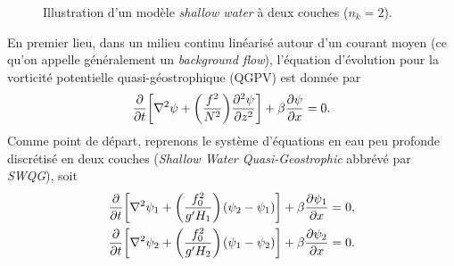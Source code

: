 \documentclass[10pt]{article}
\numberwithin{equation}{section}
\newcommand{\pt}{\hspace{1pt}} %
\begin{document}
\begin{figure}
\begin{center}
\vspace{-\baselineskip}
\end{center}
\caption{\label{org3e55fbe}Illustration d'un modèle \textit{shallow water} à deux couches (\(n_k = 2\)).}
\end{figure}

En premier lieu, dans un milieu continu linéarisé autour d'un courant moyen (ce qu'on appelle généralement un \emph{background flow}), l'équation d'évolution pour la vorticité potentielle quasi-géostrophique (QGPV) est donnée par
\begin{equation}
\label{eq:org970df7f}
   \pdv{}{t} \qty[\laplacian\psi + \qty(\frac{f^2}{N^2})\pdv[2]{\psi}{z}] + \beta \pdv{\psi}{x} = 0.
\end{equation}
Comme point de départ, reprenons le système d'équations en eau peu profonde discrétisé en deux couches (\emph{Shallow Water Quasi-Geostrophic} abbrévé par \emph{SWQG}), soit
\begin{subequations}
\label{eq:org02f229c}
\begin{align}
   &\pdv{}{t} \qty[\laplacian\psi_1 + \qty(\frac{f_0^2}{g'H_1}) \pt(\psi_2 - \psi_1)] + \beta \pdv{\psi_1}{x} = 0,\\
   &\pdv{}{t} \qty[\laplacian\psi_2 + \qty(\frac{f_0^2}{g'H_2}) \pt(\psi_1 - \psi_2)] + \beta \pdv{\psi_2}{x} = 0.
\end{align}
\end{subequations}
\end{document}
